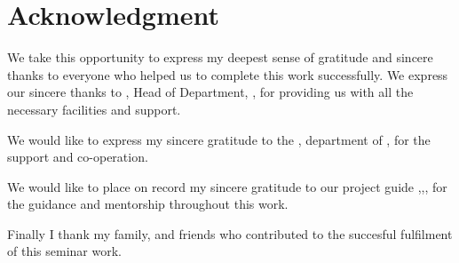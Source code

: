 \chapter*{Acknowledgment}%
%



\par We take this opportunity to express my deepest sense of gratitude and sincere thanks to everyone who helped us to complete this work successfully. We express our sincere thanks to \hod, Head of Department, \dept, \college\hspace*{2pt} for providing  us with all the necessary facilities and support.\par

We would like to express my sincere gratitude to the \projcordinatorA, \hspace*{2pt} department of \hspace*{2pt} \dept, \hspace*{2pt} \college \hspace*{2pt} \hspace*{2pt} for the support and co-operation.

We would like to place on record my sincere gratitude to our project guide \guide,\hspace*{2pt}\guidedes,\hspace*{2pt}\dept,\hspace*{2pt}\college \hspace*{2pt} %
for the guidance and mentorship throughout this work.

Finally I thank my family, and friends who contributed to the succesful fulfilment of this seminar work.

\vspace*{30pt}
\begin{flushright}
	\textbf{\studentA}\\
	\textbf{\studentB}\\
	\textbf{\studentC}\\
	\textbf{\studentD}\\
\end{flushright}
\thispagestyle{plain}
